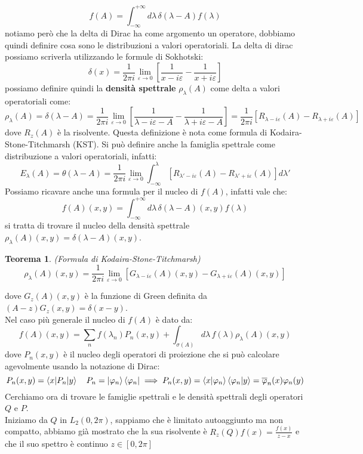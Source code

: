 \documentclass[12pt]{book}
\theoremstyle{plain}
\newtheorem{thm}{Teorema}[section]
\theoremstyle{definition}
\theoremstyle{remark}
\begin{document}
\[f(A) = \int_{-\infty}^{+\infty}d\lambda\, \delta(\lambda-A)f(\lambda)\]
notiamo però che la delta di Dirac ha come argomento un operatore, dobbiamo quindi definire cosa sono le distribuzioni a valori operatoriali. 
La delta di dirac possiamo scriverla utilizzando le formule di Sokhotski:
\[\delta(x) = \frac{1}{2\pi i}\lim_{\varepsilon\to0}\left[\frac{1}{x-i\varepsilon} - \frac{1}{x+i\varepsilon} \right]\]
possiamo definire quindi la \textbf{densità spettrale} $\rho_\lambda(A)$ come delta a valori operatoriali come:
\[\rho_\lambda(A) = \delta(\lambda-A) = \frac{1}{2\pi i}\lim_{\varepsilon\to0}\left[\frac{1}{\lambda-i\varepsilon-A} - \frac{1}{\lambda+i\varepsilon -A} \right] = \frac{1}{2\pi i}\left[R_{\lambda-i\varepsilon}(A) - R_{\lambda+i\varepsilon}(A)\right] \]
dove $R_z(A)$ è la risolvente. Questa definizione è nota come formula di Kodaira-Stone-Titchmarsh (KST). Si può definire anche la famiglia spettrale come distribuzione a valori operatoriali, infatti:
\[E_\lambda(A) = \theta(\lambda-A) = \frac{1}{2\pi i}\lim_{\varepsilon\to0} \int_{-\infty}^\lambda[R_{\lambda'-i\varepsilon}(A) - R_{\lambda'+i\varepsilon}(A)]d\lambda' \]
Possiamo ricavare anche una formula per il nucleo di $f(A)$, infatti vale che:
\[f(A)(x,y) =  \int_{-\infty}^{+\infty}d\lambda\, \delta(\lambda-A)(x,y)f(\lambda)\]
si tratta di trovare il nucleo della densità spettrale $\rho_\lambda(A)(x,y) = \delta(\lambda-A)(x,y)$.
\begin{thm}(Formula di Kodaira-Stone-Titchmarsh)
\[\rho_\lambda(A)(x,y) = \frac{1}{2\pi i}\lim_{\varepsilon\to0}[G_{\lambda-i\varepsilon}(A)(x,y) - G_{\lambda+i\varepsilon}(A)(x,y)]\]
\end{thm}
dove $G_z(A)(x,y)$ è la funzione di Green definita da $(A-z)G_z(x,y) = \delta(x-y)$.\\ Nel caso più generale il nucleo di $f(A)$ è dato da:
\[f(A)(x,y) = \sum_n f(\lambda_n) P_n(x,y) + \int_{\sigma(A)}d\lambda\,f(\lambda)\rho_\lambda(A)(x,y)\]
dove $P_n(x,y)$ è il nucleo degli operatori di proiezione che si può calcolare agevolmente usando la notazione di Dirac:
\[P_n(x,y) = \braket{x|P_n|y}\quad P_n = \ket{\varphi_n}\bra{\varphi_n} \implies P_n(x,y) = \braket{x|\varphi_n}\braket{\varphi_n|y} = \overline{\varphi}_n(x)\varphi_n(y) \] 
Cerchiamo ora di trovare le famiglie spettrali e le densità spettrali degli operatori $Q$ e $P$.\\ Iniziamo da $Q$ in $L_2(0,2\pi)$, sappiamo che è limitato autoaggiunto ma non compatto, abbiamo già mostrato che la sua risolvente è $R_z(Q)f(x) = \frac{f(x)}{z-x}$ e che il suo spettro è continuo $z\in[0,2\pi]$
\end{document}
